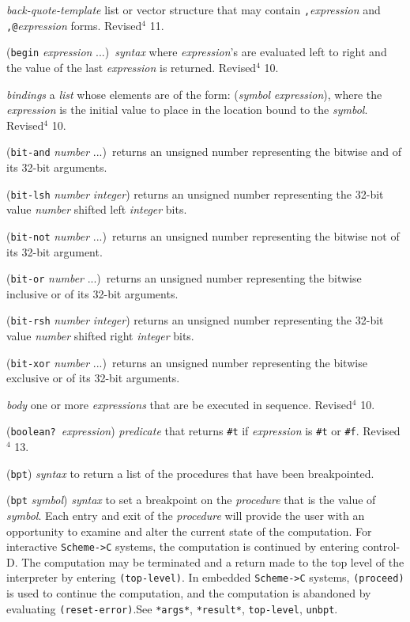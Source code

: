 \documentclass[10pt,twocolumn]{article}
\begin{document}
\emph{back-quote-template} list or vector structure that may contain
\texttt{,}\emph{expression} and \texttt{,@}\emph{expression} forms.  Revised$^4$ 11.

(\texttt{begin} \emph{expression} ...)\ \emph{syntax} where \emph{expression}'s are
evaluated left to right and the value of the last \emph{expression} is
returned. Revised$^4$ 10.

\emph{bindings} a \emph{list} whose elements are of the form: (\emph{symbol}
\emph{expression}), where the \emph{expression} is the initial value to
place in the location bound to the \emph{symbol}. Revised$^4$ 10.

(\texttt{bit-and} \emph{number} ...)\ returns an unsigned
number representing the bitwise and of its 32-bit arguments.

(\texttt{bit-lsh} \emph{number} \emph{integer}) returns an unsigned
number representing the 32-bit value \emph{number} shifted left
\emph{integer} bits.

(\texttt{bit-not} \emph{number} ...)\ returns an unsigned number
representing the bitwise not of its 32-bit argument.

(\texttt{bit-or} \emph{number} ...)\ returns an unsigned number representing
the bitwise inclusive or of its 32-bit arguments.

(\texttt{bit-rsh} \emph{number} \emph{integer}) returns an unsigned
number representing the 32-bit value \emph{number} shifted right
\emph{integer} bits.

(\texttt{bit-xor} \emph{number} ...)\ returns an unsigned number representing
the bitwise exclusive or of its 32-bit arguments.

\emph{body} one or more \emph{expressions} that are be executed in
sequence. Revised$^4$ 10.

(\texttt{boolean?}\ \emph{expression}) \emph{predicate} that returns
\texttt{\#t} if \emph{expression} is \texttt{\#t} or \texttt{\#f}.  Revised$^4$ 13.

(\texttt{bpt}) \emph{syntax} to return a list of the procedures that have
been breakpointed.

(\texttt{bpt} \emph{symbol}) \emph{syntax} to set a breakpoint on the
\emph{procedure} that is the value of \emph{symbol}.  Each entry and exit
of the \emph{procedure} will provide the user with an opportunity to
examine and alter the current state of the computation.  For
interactive \texttt{Scheme->C} systems, the computation is continued by
entering control-D.  The computation may be terminated and a return
made to the top level of the interpreter by entering \texttt{(top-level)}.
In embedded \texttt{Scheme->C} systems, \texttt{(proceed)} is used to continue
the computation, and the computation is abandoned by evaluating
\texttt{(reset-error)}.See \texttt{*args*}, \texttt{*result*}, \texttt{top-level},
\texttt{unbpt}.
\end{document}
